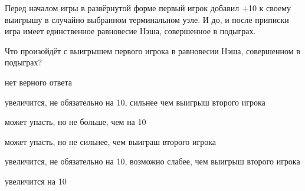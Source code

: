 
\begin{question}
Перед началом игры в развёрнутой форме первый игрок добавил +10 к своему выигрышу
в случайно выбранном терминальном узле. И до, и после приписки игра имеет единственное равновесие Нэша, совершенное в подыграх.

Что произойдёт с выигрышем первого игрока в равновесии Нэша, совершенном в подыграх?
\begin{answerlist}
  \item нет верного ответа
  \item увеличится, не обязательно на 10, сильнее чем выигрыш второго игрока
  \item может упасть, но не больше, чем на 10
  \item может упасть, но не сильнее, чем выиграш второго игрока
  \item увеличится, не обязательно на 10, возможно слабее, чем выигрыш второго игрока
  \item увеличится на 10
\end{answerlist}
\end{question}


